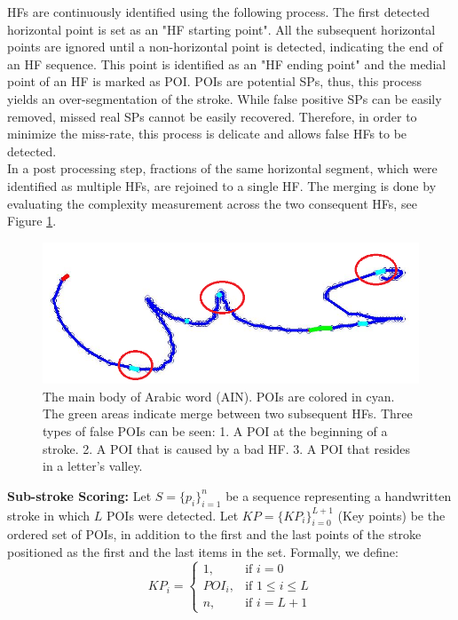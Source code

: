 \documentclass[10pt, conference, compsocconf]{IEEEtran}
\begin{document}
HFs are continuously identified using the following process.
The first detected horizontal point is set as an "HF starting point". 
All the subsequent horizontal points are ignored until a non-horizontal point is detected, indicating the end of an HF sequence. 
This point is identified as an "HF ending point" and the medial point of an HF is marked as POI. 
POIs are potential SPs, thus, this process yields an over-segmentation of the stroke. 
While false positive SPs can be easily removed, missed real SPs cannot be easily recovered. 
Therefore, in order to minimize the miss-rate, this process is delicate and allows false HFs to be detected.\\

In a post processing step, fractions of the same horizontal segment, which were identified as multiple HFs, are rejoined to a single HF. 
The merging is done by evaluating the complexity measurement across the two consequent HFs, see Figure \ref{fig:candidate_in_no_horizontal}.\\

\begin{figure}
\centering
\includegraphics[width=0.5\columnwidth]{./figures/candidate_in_no_horizontal}
\caption{The main body of Arabic word  (AIN). POIs are colored in cyan. The green areas indicate merge between two subsequent HFs. Three types of false POIs can be seen: 1. A POI at the beginning of a stroke. 2. A POI that is caused by a bad HF. 3. A POI that resides in a letter's valley. }
\label{fig:candidate_in_no_horizontal}
\end{figure}

\textbf{Sub-stroke Scoring:}
Let $S=\{p_{i}\}_{i=1}^{n}$ be a sequence representing a handwritten stroke in which $L$ POIs were detected. 
Let $KP=\{KP_{i}\}_{i=0}^{L+1}$ (Key points) be the ordered set of POIs, in addition to the first and the last points of the stroke positioned as the first and the last items in the set.
Formally, we define: 
\begin{equation}
KP_{i} =\begin{cases}    1		, & \mbox{if } i=0 \\
							   POI_{i}	, & \mbox{if } 1\leq i \leq L \\
							   n    , & \mbox{if } i=L+1 
			\end{cases}				
\end{equation}
\end{document}
